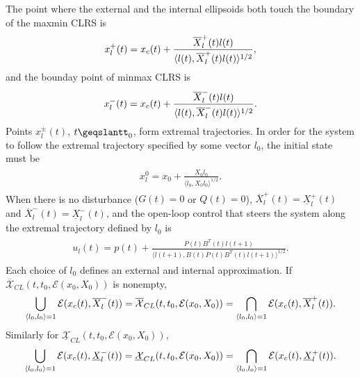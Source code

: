 \documentclass[letterpaper,10pt,english]{sphinxmanual}
\begin{document}
The point where the external and the internal ellipsoids both touch the
boundary of the maxmin CLRS is
\begin{gather}
\begin{split}x_l^+(t) = x_c(t) + \frac{\overline{X}^+_l(t)l(t)}{\langle l(t),
\overline{X}^+_l(t)l(t)\rangle^{1/2}} ,\end{split}\notag
\end{gather}
and the bounday point of minmax CLRS is
\begin{gather}
\begin{split}x_l^-(t) = x_c(t) + \frac{\overline{X}^-_l(t)l(t)}{\langle l(t),
\overline{X}^-_l(t)l(t)\rangle^{1/2}} .\end{split}\notag
\end{gather}
Points $x^{\pm}_l(t)$, $t\geqslantt_0$, form extremal
trajectories. In order for the system to follow the extremal trajectory
specified by some vector $l_0$, the initial state must be
\label{chap_reach:equation-dx01}\begin{gather}
\begin{split}x_l^0 = x_0 + \frac{X_0l_0}{\langle l_0, X_0l_0\rangle^{1/2}}.\end{split}\label{chap_reach-dx01}
\end{gather}
When there is no disturbance ($G(t)=0$ or $Q(t)=0$),
$\overline{X}^+_l(t)=\underline{X}^+_l(t)$ and
$\overline{X}^-_l(t)=\underline{X}^-_l(t)$, and the open-loop
control that steers the system along the extremal trajectory defined by
$l_0$ is
\label{chap_reach:equation-udt}\begin{gather}
\begin{split}u_l(t) = p(t) + \frac{P(t)B^T(t)l(t+1)}{\langle l(t+1),
B(t)P(t)B^T(t)l(t+1)\rangle^{1/2}}.\end{split}\label{chap_reach-udt}
\end{gather}
Each choice of $l_0$ defines an external and internal
approximation. If $\overline{{\mathcal X}}_{CL}(t,t_0,{\mathcal E}(x_0,X_0))$ is
nonempty,
\begin{gather}
\begin{split}\bigcup_{\langle l_0,l_0\rangle=1}{\mathcal E}(x_c(t),\overline{X}^-_l(t)) =
\overline{{\mathcal X}}_{CL}(t,t_0,{\mathcal E}(x_0,X_0)) =
\bigcap_{\langle l_0,l_0\rangle=1}{\mathcal E}(x_c(t),\overline{X}^+_l(t)).\end{split}\notag
\end{gather}
Similarly for
$\underline{{\mathcal X}}_{CL}(t,t_0,{\mathcal E}(x_0,X_0))$,
\begin{gather}
\begin{split}\bigcup_{\langle l_0,l_0\rangle=1}{\mathcal E}(x_c(t),\underline{X}^-_l(t)) =
\underline{{\mathcal X}}_{CL}(t,t_0,{\mathcal E}(x_0,X_0)) =
\bigcap_{\langle l_0,l_0\rangle=1}{\mathcal E}(x_c(t),\underline{X}^+_l(t)).\end{split}\notag
\end{gather}
\end{document}
